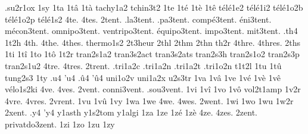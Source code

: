.su2r1ox
1sy
1ta
1tâ
1tà
tachy1a2
tchin3t2
1te
1té
1tè
1tê
télé1e2
télé1i2
télé1o2b
télé1o2p
télé1s2
4te.
4tes.
2tent.
.la3tent.
.pa3tent.
compé3tent.
éni3tent.
mécon3tent.
omnipo3tent.
ventripo3tent.
équipo3tent.
impo3tent.
mit3tent.
.th4
1t2h
4th.
4the.
4thes.
thermo1s2
2t3heur
2thl
2thm
2thn
th2r
4thre.
4thres.
2ths
1ti
1tî
1to
1tô
1t2r
tran2s1a2
tran3s2act
tran3s2ats
tran2s3h
tran2s1o2
tran2s3p
tran2s1u2
4tre.
4tres.
2trent.
.tri1a2c
.tri1a2n
.tri1a2t
.tri1o2n
t1t2l
1tu
1tû
tung2s3
1ty
.u4
'u4
.û4
'û4
uni1o2v
uni1a2x
u2s3tr
1va
1vâ
1ve
1vé
1vè
1vê
vélo1s2ki
4ve.
4ves.
2vent.
conni3vent.
.sou3vent.
1vi
1vî
1vo
1vô
vol2t1amp
1v2r
4vre.
4vres.
2vrent.
1vu
1vû
1vy
1wa
1we
4we.
4wes.
2went.
1wi
1wo
1wu
1w2r
2xent.
.y4
'y4
y1asth
y1s2tom
y1algi
1za
1ze
1zé
1zè
4ze.
4zes.
2zent.
privatdo3zent.
1zi
1zo
1zu
1zy